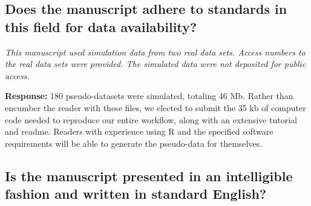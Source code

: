 \documentclass{article}
\providecommand{\q}{$\quad$ \newline}
\begin{document}
\begin{flushleft}
\begin{enumerate}
\end{enumerate}










\subsection{Does the manuscript adhere to standards in this field for data availability?}

\emph{This manuscript used simulation data from two real data sets. Access numbers to the real data sets were provided. The simulated data were not deposited for public access.} \q

{\bf Response:} 180 pseudo-datasets were simulated, totaling 46 Mb. Rather than encumber the reader with these files, we elected to submit the 35 kb of computer code needed to reproduce our entire workflow, along with an extensive tutorial and readme. Readers with experience using R and the specified software requirements will be able to generate the pseudo-data for themselves.

\subsection{Is the manuscript presented in an intelligible fashion and written in standard English?}


\end{flushleft}
\end{document}
